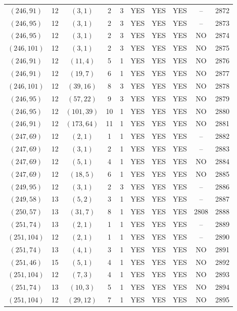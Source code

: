 \begin{longtable}{|c|c|c|c|c|c|c|c|c|c|}
$(246, 91)$ & 12 & $(3, 1)$ & 2 & 3 & YES & YES & YES & -- & 2872\\
$(246, 95)$ & 12 & $(3, 1)$ & 2 & 3 & YES & YES & YES & -- & 2873\\
$(246, 95)$ & 12 & $(3, 1)$ & 2 & 3 & YES & YES & YES & NO & 2874\\
$(246, 101)$ & 12 & $(3, 1)$ & 2 & 3 & YES & YES & YES & NO & 2875\\
$(246, 91)$ & 12 & $(11, 4)$ & 5 & 1 & YES & YES & YES & NO & 2876\\
$(246, 91)$ & 12 & $(19, 7)$ & 6 & 1 & YES & YES & YES & NO & 2877\\
$(246, 101)$ & 12 & $(39, 16)$ & 8 & 3 & YES & YES & YES & NO & 2878\\
$(246, 95)$ & 12 & $(57, 22)$ & 9 & 3 & YES & YES & YES & NO & 2879\\
$(246, 95)$ & 12 & $(101, 39)$ & 10 & 1 & YES & YES & YES & NO & 2880\\
$(246, 91)$ & 12 & $(173, 64)$ & 11 & 1 & YES & YES & YES & NO & 2881\\
$(247, 69)$ & 12 & $(2, 1)$ & 1 & 1 & YES & YES & YES & -- & 2882\\
$(247, 69)$ & 12 & $(3, 1)$ & 2 & 1 & YES & YES & YES & -- & 2883\\
$(247, 69)$ & 12 & $(5, 1)$ & 4 & 1 & YES & YES & YES & NO & 2884\\
$(247, 69)$ & 12 & $(18, 5)$ & 6 & 1 & YES & YES & YES & NO & 2885\\
$(249, 95)$ & 12 & $(3, 1)$ & 2 & 3 & YES & YES & YES & -- & 2886\\
$(249, 58)$ & 13 & $(5, 2)$ & 3 & 1 & YES & YES & YES & -- & 2887\\
$(250, 57)$ & 13 & $(31, 7)$ & 8 & 1 & YES & YES & YES & 2808 & 2888\\
$(251, 74)$ & 13 & $(2, 1)$ & 1 & 1 & YES & YES & YES & -- & 2889\\
$(251, 104)$ & 12 & $(2, 1)$ & 1 & 1 & YES & YES & YES & -- & 2890\\
$(251, 74)$ & 13 & $(4, 1)$ & 3 & 1 & YES & YES & YES & NO & 2891\\
$(251, 46)$ & 15 & $(5, 1)$ & 4 & 1 & YES & YES & YES & NO & 2892\\
$(251, 104)$ & 12 & $(7, 3)$ & 4 & 1 & YES & YES & YES & NO & 2893\\
$(251, 74)$ & 13 & $(10, 3)$ & 5 & 1 & YES & YES & YES & NO & 2894\\
$(251, 104)$ & 12 & $(29, 12)$ & 7 & 1 & YES & YES & YES & NO & 2895\\

\end{longtable}
